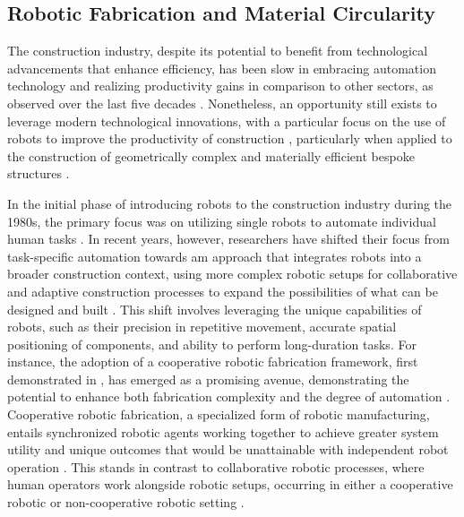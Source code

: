 \subsection{Robotic Fabrication and Material Circularity} \label{sec:2b_robs}
    The construction industry, despite its potential to benefit from technological advancements that enhance efficiency, has been slow in embracing automation technology and realizing productivity gains in comparison to other sectors, as observed over the last five decades \citep{barbosa_reinventing_2017}. Nonetheless, an opportunity still exists to leverage modern technological innovations, with a particular focus on the use of robots to improve the productivity of construction \citep{the_business_research_company_global_2023}, particularly when applied to the construction of geometrically complex and materially efficient bespoke structures \citep{garcia_de_soto_productivity_2018}.
    
    In the initial phase of introducing robots to the construction industry during the 1980s, the primary focus was on utilizing single robots to automate individual human tasks \citep{bock_construction_2007, bock_construction_2016}. In recent years, however, researchers have shifted their focus from task-specific automation towards am approach that integrates robots into a broader construction context, using more complex robotic setups for collaborative and adaptive construction processes to expand the possibilities of what can be designed and built \citep{gramazio_digital_2008,parascho_construction_2023}. This shift involves leveraging the unique capabilities of robots, such as their precision in repetitive movement, accurate spatial positioning of components, and ability to perform long-duration tasks. For instance, the adoption of a cooperative robotic fabrication framework, first demonstrated in \cite{parascho_cooperative_2017}, has emerged as a promising avenue, demonstrating the potential to enhance both fabrication complexity and the degree of automation \citep{bruun_three_2021, mesnil_flexible_2023}. Cooperative robotic fabrication, a specialized form of robotic manufacturing, entails synchronized robotic agents working together to achieve greater system utility and unique outcomes that would be unattainable with independent robot operation \citep{cao_cooperative_1997}. This stands in contrast to collaborative robotic processes, where human operators work alongside robotic setups, occurring in either a cooperative robotic \citep{bruun_humanrobot_2020} or non-cooperative robotic setting \citep{weckenborg_balancing_2020}.
    
